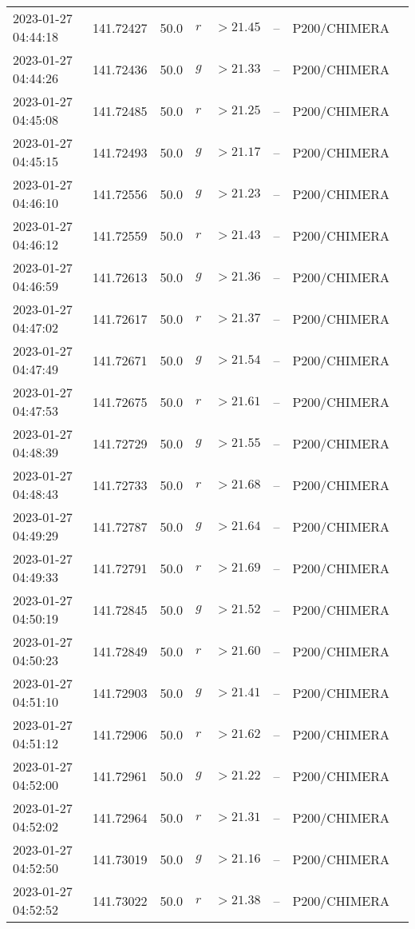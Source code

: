 \documentclass{nature_plusfigure}
\begin{document}
\begin{supplement}
\begin{center}
\begin{longtable}{llllllll}
2023-01-27 04:44:18 & 141.72427 & 50.0 & $r$ & $>21.45$ & -- & P200/CHIMERA &  \\ 
2023-01-27 04:44:26 & 141.72436 & 50.0 & $g$ & $>21.33$ & -- & P200/CHIMERA &  \\ 
2023-01-27 04:45:08 & 141.72485 & 50.0 & $r$ & $>21.25$ & -- & P200/CHIMERA &  \\ 
2023-01-27 04:45:15 & 141.72493 & 50.0 & $g$ & $>21.17$ & -- & P200/CHIMERA &  \\ 
2023-01-27 04:46:10 & 141.72556 & 50.0 & $g$ & $>21.23$ & -- & P200/CHIMERA &  \\ 
2023-01-27 04:46:12 & 141.72559 & 50.0 & $r$ & $>21.43$ & -- & P200/CHIMERA &  \\ 
2023-01-27 04:46:59 & 141.72613 & 50.0 & $g$ & $>21.36$ & -- & P200/CHIMERA &  \\ 
2023-01-27 04:47:02 & 141.72617 & 50.0 & $r$ & $>21.37$ & -- & P200/CHIMERA &  \\ 
2023-01-27 04:47:49 & 141.72671 & 50.0 & $g$ & $>21.54$ & -- & P200/CHIMERA &  \\ 
2023-01-27 04:47:53 & 141.72675 & 50.0 & $r$ & $>21.61$ & -- & P200/CHIMERA &  \\ 
2023-01-27 04:48:39 & 141.72729 & 50.0 & $g$ & $>21.55$ & -- & P200/CHIMERA &  \\ 
2023-01-27 04:48:43 & 141.72733 & 50.0 & $r$ & $>21.68$ & -- & P200/CHIMERA &  \\ 
2023-01-27 04:49:29 & 141.72787 & 50.0 & $g$ & $>21.64$ & -- & P200/CHIMERA &  \\ 
2023-01-27 04:49:33 & 141.72791 & 50.0 & $r$ & $>21.69$ & -- & P200/CHIMERA &  \\ 
2023-01-27 04:50:19 & 141.72845 & 50.0 & $g$ & $>21.52$ & -- & P200/CHIMERA &  \\ 
2023-01-27 04:50:23 & 141.72849 & 50.0 & $r$ & $>21.60$ & -- & P200/CHIMERA &  \\ 
2023-01-27 04:51:10 & 141.72903 & 50.0 & $g$ & $>21.41$ & -- & P200/CHIMERA &  \\ 
2023-01-27 04:51:12 & 141.72906 & 50.0 & $r$ & $>21.62$ & -- & P200/CHIMERA &  \\ 
2023-01-27 04:52:00 & 141.72961 & 50.0 & $g$ & $>21.22$ & -- & P200/CHIMERA &  \\ 
2023-01-27 04:52:02 & 141.72964 & 50.0 & $r$ & $>21.31$ & -- & P200/CHIMERA &  \\ 
2023-01-27 04:52:50 & 141.73019 & 50.0 & $g$ & $>21.16$ & -- & P200/CHIMERA &  \\ 
2023-01-27 04:52:52 & 141.73022 & 50.0 & $r$ & $>21.38$ & -- & P200/CHIMERA &  \\ 

\end{longtable}
\end{center}
\end{supplement}
\end{document}
